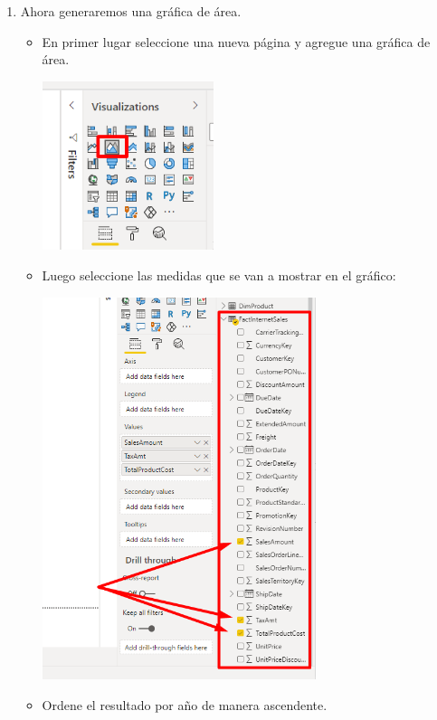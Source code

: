 \documentclass[12pt,letterpaper]{article}
\newcommand\tab[1][1cm]{\hspace*{#1}}
\begin{document}
\begin{enumerate}[\tab 1.]
\begin{itemize}
\begin{center}
            \end{center}
        \end{itemize}
        \item Ahora generaremos una gráfica de área.
        \begin{itemize}
            \item En primer lugar seleccione una nueva página y agregue una gráfica de área.
            \begin{center}
                \includegraphics[width=5cm]{./img/img11.1.png}
            \end{center}
            \item Luego seleccione las medidas que se van a mostrar en el gráfico:
            \begin{center}
                \includegraphics[width=8cm]{./img/img11.2.png}
            \end{center}
            \item Ordene el resultado por año de manera ascendente.
            \begin{center}

\end{center}
\end{itemize}
\end{enumerate}
\end{document}
